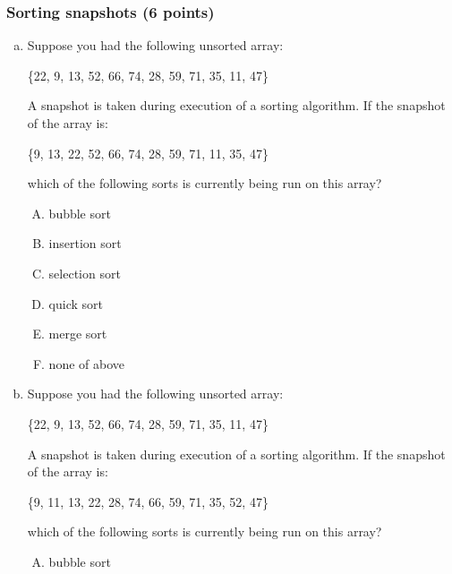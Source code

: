 \documentclass[11pt]{exam}
\begin{document}


\subsubsection{Sorting snapshots (6 points)}

\begin{enumerate}[(a)]
    \item Suppose you had the following unsorted array:
        \begin{center}
            \{22, 9, 13, 52, 66, 74, 28, 59, 71, 35, 11, 47\}
        \end{center}
        A snapshot is taken during execution of a sorting algorithm. If the snapshot of the array is:
        \begin{center}
            \{9, 13, 22, 52, 66, 74, 28, 59, 71, 11, 35, 47\}
        \end{center}
        which of the following sorts is currently being run on this array?
        \begin{enumerate}[A)]
            \item bubble sort
            \item insertion sort
            \item selection sort
            \item quick sort
            \item merge sort
            \item none of above
        \end{enumerate}
        \begin{solution}
        \end{solution}
    \item Suppose you had the following unsorted array:
        \begin{center}
            \{22, 9, 13, 52, 66, 74, 28, 59, 71, 35, 11, 47\}
        \end{center}
        A snapshot is taken during execution of a sorting algorithm. If the snapshot of the array is:
        \begin{center}
            \{9, 11, 13, 22, 28, 74, 66, 59, 71, 35, 52, 47\}
        \end{center}
        which of the following sorts is currently being run on this array?
        \begin{enumerate}[A)]
            \item bubble sort

\end{enumerate}
\end{enumerate}
\end{document}
